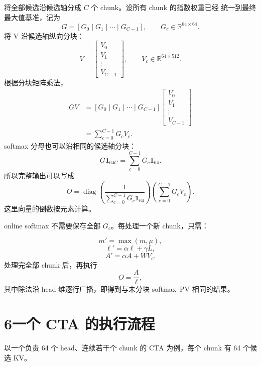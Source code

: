 \documentclass[UTF8,fontset=fandol,a4paper,10pt]{ctexart}
\newcommand{\diag}{\operatorname{diag}}
\begin{document}
将全部候选沿候选轴分成 $C$ 个 chunk。设所有 chunk 的指数权重已经
统一到最终最大值基准，记为
\[
  G=[G_0\mid G_1\mid\cdots\mid G_{C-1}],
  \qquad
  G_c\in\mathbb R^{64\times64}.
\]
将 V 沿候选轴纵向分块：
\[
  V=
  \begin{bmatrix}
    V_0\\
    V_1\\
    \vdots\\
    V_{C-1}
  \end{bmatrix},
  \qquad
  V_c\in\mathbb R^{64\times512}.
\]
根据分块矩阵乘法，
\begin{align*}
  GV
  &=
  [G_0\mid G_1\mid\cdots\mid G_{C-1}]
  \begin{bmatrix}
    V_0\\
    V_1\\
    \vdots\\
    V_{C-1}
  \end{bmatrix}\\
  &=
  \boxed{
    \sum_{c=0}^{C-1}G_cV_c
  }.
\end{align*}
softmax 分母也可以沿相同的候选轴分块：
\[
  G\mathbf 1_{64C}
  =
  \sum_{c=0}^{C-1}G_c\mathbf 1_{64}.
\]
所以完整输出可以写成
\[
  \boxed{
  O
  =
  \diag\!\left(
    \frac{1}{
      \sum_{c=0}^{C-1}G_c\mathbf 1_{64}
    }
  \right)
  \left(
    \sum_{c=0}^{C-1}G_cV_c
  \right)
  }.
\]
这里向量的倒数按元素计算。

online softmax 不需要保存全部 $G_c$。每处理一个新 chunk，只需：

\[
  m'=\max(m,\mu),
\]
\[
  \ell'=\alpha\ell+\gamma L,
\]
\[
  A'=\alpha A+WV_c.
\]
处理完全部 chunk 后，再执行
\[
  \boxed{
    O=\frac{A}{\ell}
  },
\]
其中除法沿 head 维逐行广播，即得到与未分块 softmax--PV 相同的结果。

\section*{6\quad 一个 CTA 的执行流程}

以一个负责 64 个 head、连续若干个 chunk 的 CTA 为例，每个 chunk 有 64 个候选 KV。
\end{document}
